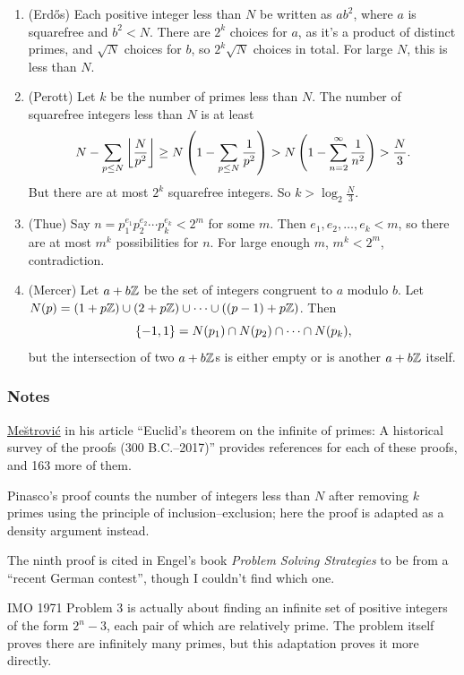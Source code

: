 \documentclass[11pt,paper=letter]{scrartcl}
\begin{document}
\begin{enumerate}
\item (Erd\H{o}s) Each positive integer less than $N$ be written as $ab^2$, where $a$ is squarefree and $b^2 < N$. There are $2^k$ choices for $a$, as it's a product of distinct primes, and $\sqrt{N}$ choices for $b$, so $2^k\sqrt{N}$ choices in total. For large $N$, this is less than $N$.

\item (Perott) Let $k$ be the number of primes less than $N$. The number of squarefree integers less than $N$ is at least $$N - \sum_{p \le N} \left\lfloor \frac{N}{p^2} \right\rfloor \ge N\left( 1 - \sum_{p \le N} \frac{1}{p^2} \right) > N\left( 1 - \sum_{n=2}^{\infty} \frac{1}{n^2} \right) > \frac{N}{3}.$$
But there are at most $2^k$ squarefree integers. So $k > \log_2 \frac{N}{3}$.

\item (Thue) Say $n = p_1^{e_1}p_2^{e_2}\cdots p_k^{e_k} < 2^m$ for some $m$. Then $e_1, e_2, \ldots, e_k < m$, so there are at most $m^k$ possibilities for $n$. For large enough $m$, $m^k < 2^m$, contradiction.

\item (Mercer) Let $a + b\mathbb Z$ be the set of integers congruent to $a$ modulo $b$. Let $N(p) = (1 + p\mathbb Z) \cup (2 + p\mathbb Z) \cup \cdots \cup \left( (p-1) + p\mathbb Z \right)$. Then
$$\left\{ -1, 1 \right\} = N(p_1) \cap N(p_2) \cap \cdots \cap N(p_k),$$
but the intersection of two $a + b \mathbb Z$s is either empty or is another $a + b \mathbb Z$ itself.

\end{enumerate}

\subsubsection*{Notes}

\href{https://arxiv.org/pdf/1202.3670.pdf}{Me\u{s}trovi\'c} in his article ``Euclid's theorem on the infinite of primes: A historical survey of the proofs (300 B.C.--2017)'' provides references for each of these proofs, and 163 more of them.

Pinasco's proof counts the number of integers less than $N$ after removing $k$ primes using the principle of inclusion--exclusion; here the proof is adapted as a density argument instead.

The ninth proof is cited in Engel's book \emph{Problem Solving Strategies} to be from a ``recent German contest'', though I couldn't find which one.

IMO 1971 Problem 3 is actually about finding an infinite set of positive integers of the form $2^n - 3$, each pair of which are relatively prime. The problem itself proves there are infinitely many primes, but this adaptation proves it more directly.
\end{document}
